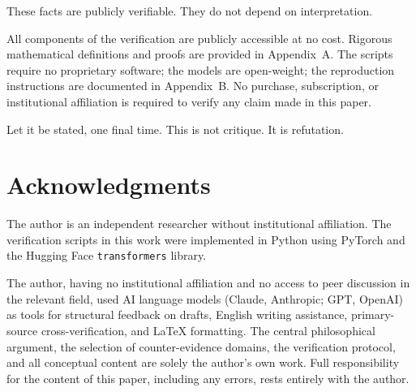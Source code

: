 \documentclass[a4paper,twocolumn,11pt]{article}
\begin{document}
These facts are publicly verifiable. They do not depend on interpretation.

All components of the verification are publicly accessible at no cost. Rigorous mathematical definitions and proofs are provided in Appendix~A. The scripts require no proprietary software; the models are open-weight; the reproduction instructions are documented in Appendix~B. No purchase, subscription, or institutional affiliation is required to verify any claim made in this paper.

Let it be stated, one final time. This is not critique. It is refutation.



\section*{Acknowledgments}

The author is an independent researcher without institutional affiliation. The verification scripts in this work were implemented in Python using PyTorch and the Hugging Face \texttt{transformers} library.

The author, having no institutional affiliation and no access to peer discussion in the relevant field, used AI language models (Claude, Anthropic; GPT, OpenAI) as tools for structural feedback on drafts, English writing assistance, primary-source cross-verification, and LaTeX formatting. The central philosophical argument, the selection of counter-evidence domains, the verification protocol, and all conceptual content are solely the author's own work. Full responsibility for the content of this paper, including any errors, rests entirely with the author.


\end{document}
